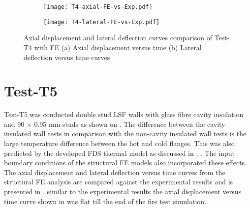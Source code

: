 \begin{figure}[!htbp]
	\centering
	\begin{subfigure}[b]{0.45\textwidth}
		\centering
		\texttt{[image: T4-axial-FE-vs-Exp.pdf]}
		\caption{}
		\label{subfig:T4-axial-FE-vs-Exp}
	\end{subfigure}
	\begin{subfigure}[b]{0.45\textwidth}
		\centering
		\texttt{[image: T4-lateral-FE-vs-Exp.pdf]}
		\caption{}
		\label{subfig:T4-lateral-FE-vs-Exp}
	\end{subfigure}
	   \caption{Axial displacement and lateral deflection curves comparison of Test-T4 with FE (a) Axial displacement versus time (b) Lateral deflection versus time curves}
	   \label{fig:T4-structural-FE-vs-Exp}
\end{figure}

\section*{Test-T5}

Test-T5 was conducted double stud LSF walls with glass fibre cavity insulation and 90 $\times$ 0.95 mm studs as shown on . The difference between the cavity insulated wall tests in comparison with the non-cavity insulated wall tests is the large temperature difference between the hot and cold flanges. This was also predicted by the developed FDS thermal model as discussed in , . The input boundary conditions of the structural FE models also incorporated these effects. The axial displacement and lateral deflection versus time curves from the structural FE analysis are compared against the experimental results and is presented in . similar to the experimental results the axial displacement versus time curve shown in  was flat till the end of the fire test simulation. 

